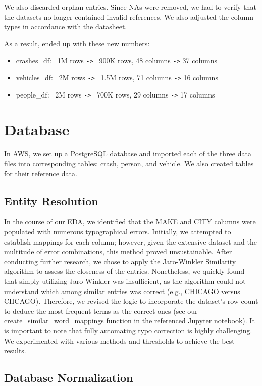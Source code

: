 \documentclass[12pt]{article}
\begin{document}
We also discarded orphan entries. Since NAs were removed, we had to verify that the datasets no longer contained invalid references. We also adjusted the column types in accordance with the datasheet.

 As a result, ended up with these new numbers:

\begin{itemize}
  \item crashes\_df: ~1M rows \verb|->| ~900K rows, 48 columns \verb|->| 37 columns
  \item vehicles\_df: ~2M rows \verb|->| ~1.5M rows, 71 columns \verb|->| 16 columns
  \item people\_df: ~2M rows \verb|->| ~700K rows, 29 columns \verb|->| 17 columns
\end{itemize}

\section{Database}

In AWS, we set up a PostgreSQL database and imported each of the three data files into corresponding tables: crash, person, and vehicle. We also created tables for their reference data.

\subsection{Entity Resolution}

In the course of our EDA, we identified that the MAKE and CITY columns were populated with numerous typographical errors. Initially, we attempted to establish mappings for each column; however, given the extensive dataset and the multitude of error combinations, this method proved unsustainable. After conducting further research, we chose to apply the Jaro-Winkler Similarity algorithm to assess the closeness of the entries. Nonetheless, we quickly found that simply utilizing Jaro-Winkler was insufficient, as the algorithm could not understand which among similar entries was correct (e.g., CHICAGO versus CHCAGO). Therefore, we revised the logic to incorporate the dataset's row count to deduce the most frequent terms as the correct ones (see our create\_similar\_word\_mappings function in the referenced Jupyter notebook). It is important to note that fully automating typo correction is highly challenging. We experimented with various methods and thresholds to achieve the best results.


\subsection{Database Normalization}
\end{document}
